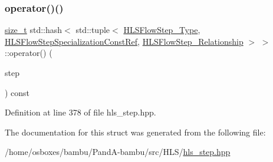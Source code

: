 \subsubsection{\texorpdfstring{operator()()}{operator()()}}
{\footnotesize\ttfamily \hyperlink{tutorial__fpt__2017_2intro_2sixth_2test_8c_a7c94ea6f8948649f8d181ae55911eeaf}{size\+\_\+t} std\+::hash$<$ std\+::tuple$<$ \hyperlink{hls__step_8hpp_ada16bc22905016180e26fc7e39537f8d}{H\+L\+S\+Flow\+Step\+\_\+\+Type}, \hyperlink{hls__step_8hpp_a5fdd2edf290c196531d21d68e13f0e74}{H\+L\+S\+Flow\+Step\+Specialization\+Const\+Ref}, \hyperlink{hls__step_8hpp_a3ad360b9b11e6bf0683d5562a0ceb169}{H\+L\+S\+Flow\+Step\+\_\+\+Relationship} $>$ $>$\+::operator() (\begin{DoxyParamCaption}\item[{std\+::tuple$<$ \hyperlink{hls__step_8hpp_ada16bc22905016180e26fc7e39537f8d}{H\+L\+S\+Flow\+Step\+\_\+\+Type}, \hyperlink{hls__step_8hpp_a5fdd2edf290c196531d21d68e13f0e74}{H\+L\+S\+Flow\+Step\+Specialization\+Const\+Ref}, \hyperlink{hls__step_8hpp_a3ad360b9b11e6bf0683d5562a0ceb169}{H\+L\+S\+Flow\+Step\+\_\+\+Relationship} $>$}]{step }\end{DoxyParamCaption}) const\hspace{0.3cm}{\ttfamily [inline]}}



Definition at line 378 of file hls\+\_\+step.\+hpp.



The documentation for this struct was generated from the following file\+:\begin{DoxyCompactItemize}
\item 
/home/osboxes/bambu/\+Pand\+A-\/bambu/src/\+H\+L\+S/\hyperlink{hls__step_8hpp}{hls\+\_\+step.\+hpp}\end{DoxyCompactItemize}
